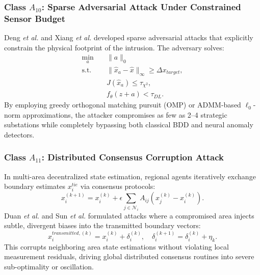 \documentclass[journal,compsoc]{IEEEtran}
\begin{document}
\subsubsection{Class $A_{10}$: Sparse Adversarial Attack Under Constrained Sensor Budget \cite{ref14, ref36, ref44, ref45, ref46, ref47, ref55, ref64}}
Deng \textit{et al.} \cite{ref14} and Xiang \textit{et al.} \cite{ref36} developed sparse adversarial attacks that explicitly constrain the physical footprint of the intrusion. The adversary solves:
\begin{align}
    \min_{a} &\quad \|a\|_0 \\
    \text{s.t.} &\quad \|\hat{x}_a - \hat{x}\|_\infty \ge \Delta x_{target}, \nonumber \\
    &\quad J(\hat{x}_a) \le \tau_{\chi^2}, \nonumber \\
    &\quad f_\theta(z + a) < \tau_{DL}. \nonumber
\end{align}
By employing greedy orthogonal matching pursuit (OMP) or ADMM-based $\ell_0$-norm approximations, the attacker compromises as few as 2--4 strategic substations while completely bypassing both classical BDD and neural anomaly detectors.

\subsubsection{Class $A_{11}$: Distributed Consensus Corruption Attack \cite{ref52, ref53, ref28, ref57, ref58, ref67, ref71, ref73, ref74}}
In multi-area decentralized state estimation, regional agents iteratively exchange boundary estimates $x_i^{tie}$ via consensus protocols:
\begin{equation}
    x_i^{(k+1)} = x_i^{(k)} + \epsilon \sum_{j \in \mathcal{N}_i} A_{ij} (x_j^{(k)} - x_i^{(k)}).
\end{equation}
Duan \textit{et al.} \cite{ref52} and Sun \textit{et al.} \cite{ref53} formulated attacks where a compromised area injects subtle, divergent biases into the transmitted boundary vectors:
\begin{equation}
    x_i^{transmitted,(k)} = x_i^{(k)} + \delta_i^{(k)}, \quad \delta_i^{(k+1)} = \delta_i^{(k)} + \eta_k.
\end{equation}
This corrupts neighboring area state estimations without violating local measurement residuals, driving global distributed consensus routines into severe sub-optimality or oscillation.
\end{document}
